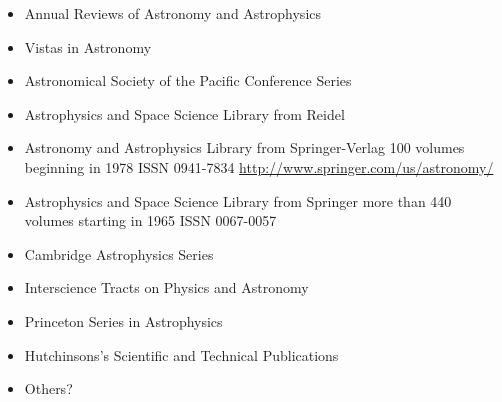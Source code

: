 \documentclass{article}
\begin{document}
\begin{itemize}
\item Annual Reviews of Astronomy and Astrophysics
\item Vistas in Astronomy
\item Astronomical Society of the Pacific Conference Series
\item Astrophysics and Space Science Library from Reidel
\item Astronomy and Astrophysics Library from Springer-Verlag
  100 volumes beginning in 1978 ISSN 0941-7834
  \url{http://www.springer.com/us/astronomy/}
\item Astrophysics and Space Science Library from Springer
  more than 440 volumes starting in 1965 ISSN 0067-0057
\item Cambridge Astrophysics Series
\item Interscience Tracts on Physics and Astronomy
\item Princeton Series in Astrophysics
\item Hutchinsons's Scientific and Technical Publications
\item Others?
\end{itemize}
\end{document}
